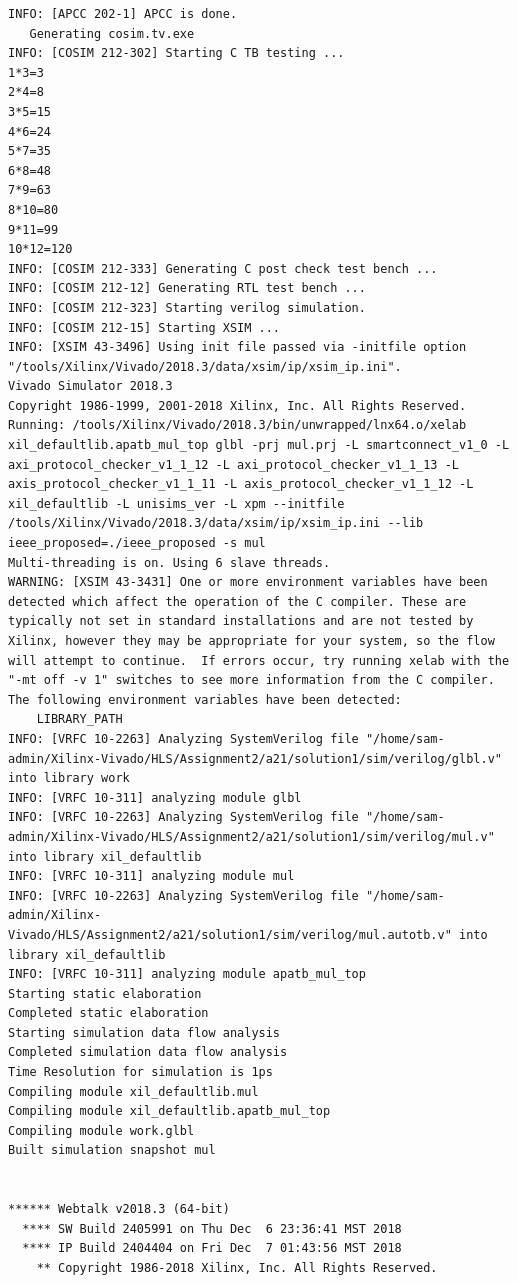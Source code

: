 \documentclass{article}
\begin{document}
\begin{lstlisting}
INFO: [APCC 202-1] APCC is done.
   Generating cosim.tv.exe
INFO: [COSIM 212-302] Starting C TB testing ... 
1*3=3
2*4=8
3*5=15
4*6=24
5*7=35
6*8=48
7*9=63
8*10=80
9*11=99
10*12=120
INFO: [COSIM 212-333] Generating C post check test bench ...
INFO: [COSIM 212-12] Generating RTL test bench ...
INFO: [COSIM 212-323] Starting verilog simulation. 
INFO: [COSIM 212-15] Starting XSIM ...
INFO: [XSIM 43-3496] Using init file passed via -initfile option "/tools/Xilinx/Vivado/2018.3/data/xsim/ip/xsim_ip.ini".
Vivado Simulator 2018.3
Copyright 1986-1999, 2001-2018 Xilinx, Inc. All Rights Reserved.
Running: /tools/Xilinx/Vivado/2018.3/bin/unwrapped/lnx64.o/xelab xil_defaultlib.apatb_mul_top glbl -prj mul.prj -L smartconnect_v1_0 -L axi_protocol_checker_v1_1_12 -L axi_protocol_checker_v1_1_13 -L axis_protocol_checker_v1_1_11 -L axis_protocol_checker_v1_1_12 -L xil_defaultlib -L unisims_ver -L xpm --initfile /tools/Xilinx/Vivado/2018.3/data/xsim/ip/xsim_ip.ini --lib ieee_proposed=./ieee_proposed -s mul 
Multi-threading is on. Using 6 slave threads.
WARNING: [XSIM 43-3431] One or more environment variables have been detected which affect the operation of the C compiler. These are typically not set in standard installations and are not tested by Xilinx, however they may be appropriate for your system, so the flow will attempt to continue.  If errors occur, try running xelab with the "-mt off -v 1" switches to see more information from the C compiler. The following environment variables have been detected:
    LIBRARY_PATH
INFO: [VRFC 10-2263] Analyzing SystemVerilog file "/home/sam-admin/Xilinx-Vivado/HLS/Assignment2/a21/solution1/sim/verilog/glbl.v" into library work
INFO: [VRFC 10-311] analyzing module glbl
INFO: [VRFC 10-2263] Analyzing SystemVerilog file "/home/sam-admin/Xilinx-Vivado/HLS/Assignment2/a21/solution1/sim/verilog/mul.v" into library xil_defaultlib
INFO: [VRFC 10-311] analyzing module mul
INFO: [VRFC 10-2263] Analyzing SystemVerilog file "/home/sam-admin/Xilinx-Vivado/HLS/Assignment2/a21/solution1/sim/verilog/mul.autotb.v" into library xil_defaultlib
INFO: [VRFC 10-311] analyzing module apatb_mul_top
Starting static elaboration
Completed static elaboration
Starting simulation data flow analysis
Completed simulation data flow analysis
Time Resolution for simulation is 1ps
Compiling module xil_defaultlib.mul
Compiling module xil_defaultlib.apatb_mul_top
Compiling module work.glbl
Built simulation snapshot mul


****** Webtalk v2018.3 (64-bit)
  **** SW Build 2405991 on Thu Dec  6 23:36:41 MST 2018
  **** IP Build 2404404 on Fri Dec  7 01:43:56 MST 2018
    ** Copyright 1986-2018 Xilinx, Inc. All Rights Reserved.



\end{lstlisting}
\end{document}

